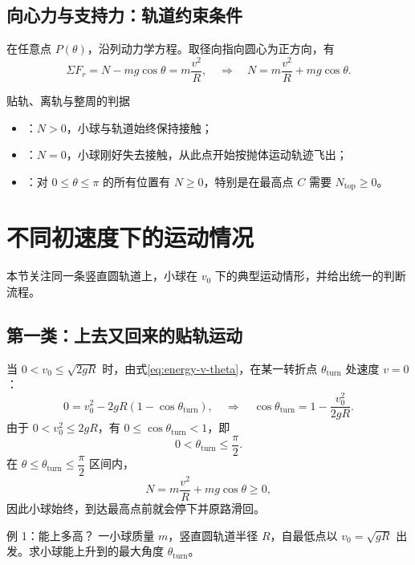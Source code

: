 \documentclass[a4paper,11pt]{ctexart}
\begin{document}
\subsection{向心力与支持力：轨道约束条件}

在任意点 $P(\theta)$，沿列动力学方程。取径向指向圆心为正方向，有
\[
  \Sigma F_r = N - mg\cos\theta = m\frac{v^2}{R},
  \quad\Rightarrow\quad
  N = m\frac{v^2}{R} + mg\cos\theta.
\]

\begin{summarybox}{贴轨、离轨与整周的判据}
  \begin{itemize}
    \item {}：$N>0$，小球与轨道始终保持接触；
    \item {}：$N=0$，小球刚好失去接触，从此点开始按抛体运动轨迹飞出；
    \item {}：对 $0\le\theta\le\pi$ 的所有位置有 $N\ge0$，特别是在最高点 $C$ 需要 $N_{\mathrm{top}}\ge 0$。
  \end{itemize}
\end{summarybox}


\section{不同初速度下的运动情况}

本节关注同一条竖直圆轨道上，小球在 $v_0$ 下的典型运动情形，并给出统一的判断流程。

\subsection{第一类：上去又回来的贴轨运动}


当 $0 < v_0 \le \sqrt{2gR}$ 时，由式\eqref{eq:energy-v-theta}，在某一转折点 $\theta_{\text{turn}}$ 处速度 $v=0$：
\[
  0 = v_0^2 - 2gR(1-\cos\theta_{\text{turn}}),
  \quad\Rightarrow\quad
  \cos\theta_{\text{turn}} = 1 - \frac{v_0^2}{2gR}.
\]
由于 $0<v_0^2\le 2gR$，有 $0\le\cos\theta_{\text{turn}}<1$，即
\[
  0 < \theta_{\text{turn}} \le \frac{\pi}{2}.
\]
在 $\theta\le\theta_{\text{turn}}\le\dfrac{\pi}{2}$ 区间内，
\[
  N = m\frac{v^2}{R} + mg\cos\theta \ge 0,
\]
因此小球始终，到达最高点前就会停下并原路滑回。

\begin{examplebox}{例 1：能上多高？}
  一小球质量 $m$，竖直圆轨道半径 $R$，自最低点以 $v_0=\sqrt{gR}$ 出发。求小球能上升到的最大角度 $\theta_{\text{turn}}$。
\end{examplebox}
\end{document}
